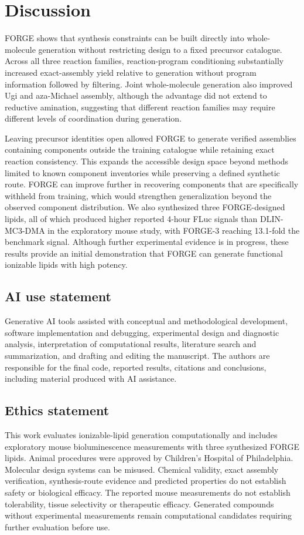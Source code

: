 \documentclass{article}
\theoremstyle{definition}
\begin{document}
\section{Discussion}
FORGE shows that synthesis constraints can be built directly into whole-molecule generation without
restricting design to a fixed precursor catalogue. Across all three reaction families,
reaction-program conditioning substantially increased exact-assembly yield relative to generation
without program information followed by filtering. Joint whole-molecule generation also improved
Ugi and aza-Michael assembly, although the advantage did not extend to reductive amination,
suggesting that different reaction families may require different levels of coordination during
generation.

Leaving precursor identities open allowed FORGE to generate verified assemblies containing
components outside the training catalogue while retaining exact reaction consistency. This expands
the accessible design space beyond methods limited to known component inventories while preserving
a defined synthetic route. FORGE can improve further in recovering components that are specifically
withheld from training, which would strengthen generalization beyond the observed component
distribution. We also synthesized three FORGE-designed lipids, all of which produced higher reported
4-hour FLuc signals than DLIN-MC3-DMA in the exploratory mouse study, with FORGE-3 reaching
13.1-fold the benchmark signal. Although further experimental evidence is in progress, these
results provide an initial demonstration that FORGE can generate functional ionizable lipids with
high potency.

\clearpage

\subsection*{AI use statement}
Generative AI tools assisted with conceptual and methodological development, software implementation
and debugging, experimental design and diagnostic analysis, interpretation of computational results,
literature search and summarization, and drafting and editing the manuscript. The authors are
responsible for the final code, reported results, citations and conclusions, including material
produced with AI assistance.

\subsection*{Ethics statement}
This work evaluates ionizable-lipid generation computationally and includes exploratory mouse
bioluminescence measurements with three synthesized FORGE lipids. Animal procedures were approved
by Children's Hospital of Philadelphia. Molecular design systems can be misused. Chemical validity,
exact assembly verification, synthesis-route evidence and predicted
properties do not establish safety or biological efficacy. The reported mouse measurements do not
establish tolerability, tissue selectivity or therapeutic efficacy. Generated compounds without
experimental measurements remain computational candidates requiring further evaluation before use.
\end{document}
